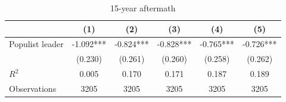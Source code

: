 \begin{table}[htbp]\centering
\def\sym#1{\ifmmode^{#1}\else\(^{#1}\)\fi}
\caption{15-year aftermath}
\begin{tabular}{l*{5}{c}}
\hline\hline
                    &\multicolumn{1}{c}{(1)}   &\multicolumn{1}{c}{(2)}   &\multicolumn{1}{c}{(3)}   &\multicolumn{1}{c}{(4)}   &\multicolumn{1}{c}{(5)}   \\
\hline
Populist leader     &      -1.092***&      -0.824***&      -0.828***&      -0.765***&      -0.726***\\
                    &     (0.230)   &     (0.261)   &     (0.260)   &     (0.258)   &     (0.262)   \\
\hline
\(R^{2}\)           &       0.005   &       0.170   &       0.171   &       0.187   &       0.189   \\
Observations        &        3205   &        3205   &        3205   &        3205   &        3205   \\
\hline\hline
\end{tabular}
\end{table}
